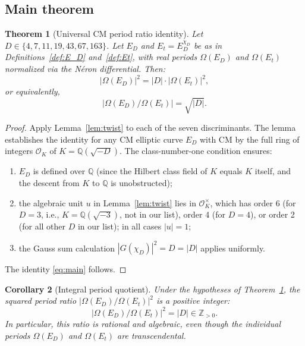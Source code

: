 \documentclass[12pt,a4paper]{article}
\theoremstyle{plain}
\newtheorem{theorem}{Theorem}[section]
\newtheorem{corollary}[theorem]{Corollary}
\theoremstyle{definition}
\newcommand{\Q}{\mathbb{Q}}
\newcommand{\Z}{\mathbb{Z}}
\newcommand{\OK}{\mathcal{O}_K}
\begin{document}
\subsection{Main theorem}

\begin{theorem}[Universal CM period ratio identity]
\label{thm:main}
Let $D \in \{4, 7, 11, 19, 43, 67, 163\}$.  Let $E_D$ and $E_t = E_D^{\chi_D}$
be as in Definitions~\ref{def:E_D} and~\ref{def:Et}, with real periods
$\Omega(E_D)$ and $\Omega(E_t)$ normalized via the N\'eron differential.
Then:
\begin{equation}
\label{eq:main}
  \bigl|\Omega(E_D)\bigr|^2 = |D| \cdot \bigl|\Omega(E_t)\bigr|^2,
\end{equation}
or equivalently,
\[
  \bigl|\Omega(E_D)/\Omega(E_t)\bigr| = \sqrt{|D|}.
\]
\end{theorem}

\begin{proof}
Apply Lemma~\ref{lem:twist} to each of the seven discriminants.
The lemma establishes the identity for any CM elliptic curve $E_D$
with CM by the full ring of integers $\OK$ of $K = \Q(\sqrt{-D})$.
The class-number-one condition ensures:
\begin{enumerate}
\item[(i)] $E_D$ is defined over $\Q$ (since the Hilbert class field of $K$
  equals $K$ itself, and the descent from $K$ to $\Q$ is unobstructed);
\item[(ii)] the algebraic unit $u$ in Lemma~\ref{lem:twist} lies in
  $\OK^\times$, which has order 6 (for $D = 3$, i.e., $K = \Q(\sqrt{-3})$,
  not in our list), order 4 (for $D = 4$), or order 2 (for all other $D$
  in our list); in all cases $|u| = 1$;
\item[(iii)] the Gauss sum calculation $|G(\chi_D)|^2 = D = |D|$ applies
  uniformly.
\end{enumerate}
The identity \eqref{eq:main} follows.
\end{proof}

\begin{corollary}[Integral period quotient]
\label{cor:integer}
Under the hypotheses of Theorem~\ref{thm:main}, the squared period ratio
$|\Omega(E_D)/\Omega(E_t)|^2$ is a positive integer:
\[
  \bigl|\Omega(E_D)/\Omega(E_t)\bigr|^2 = |D| \in \Z_{>0}.
\]
In particular, this ratio is rational and algebraic, even though the
individual periods $\Omega(E_D)$ and $\Omega(E_t)$ are transcendental.
\end{corollary}
\end{document}

